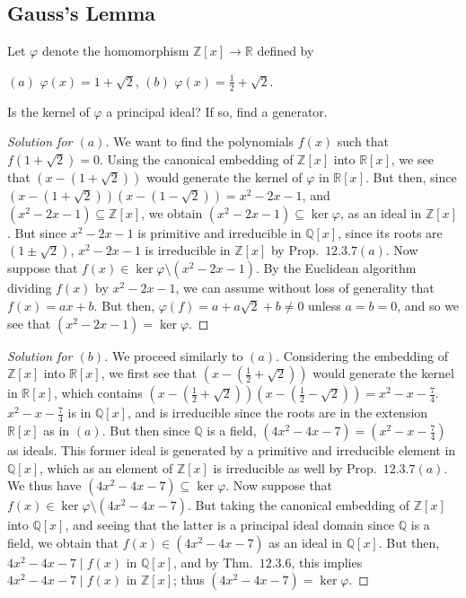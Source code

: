 \documentclass[12pt]{article}
\theoremstyle{remark}
\begin{document}
\subsection{Gauss's Lemma}
\begin{problem}
  Let $\varphi$ denote the homomorphism $\mathbb{Z}[x] \to \mathbb{R}$ defined by
  \par\noindent$(a)$ $\varphi(x) = 1 + \sqrt{2}$, $(b)$ $\varphi(x) = \frac{1}{2} + \sqrt{2}$.
  \par\noindent Is the kernel of $\varphi$ a principal ideal? If so, find a generator.
\end{problem}
\begin{proof}[Solution for $(a)$]
  We want to find the polynomials $f(x)$ such that $f(1+\sqrt{2}) = 0$. Using the canonical embedding of $\mathbb{Z}[x]$ into $\mathbb{R}[x]$, we see that $(x - (1+\sqrt{2}))$ would generate the kernel of $\varphi$ in $\mathbb{R}[x]$. But then, since $(x - (1+\sqrt{2}))(x - (1-\sqrt{2})) = x^2-2x-1$, and $(x^2-2x-1) \subseteq \mathbb{Z}[x]$, we obtain $(x^2-2x-1) \subseteq \ker\varphi$, as an ideal in $\mathbb{Z}[x]$. But since $x^2-2x-1$ is primitive and irreducible in $\mathbb{Q}[x]$, since its roots are $(1\pm\sqrt{2})$, $x^2-2x-1$ is irreducible in $\mathbb{Z}[x]$ by Prop.~$12.3.7(a)$. Now suppose that $f(x) \in \ker\varphi \setminus (x^2-2x-1)$. By the Euclidean algorithm dividing $f(x)$ by $x^2-2x-1$, we can assume without loss of generality that $f(x) = ax+b$. But then, $\varphi(f) = a + a\sqrt{2} + b \ne 0$ unless $a=b=0$, and so we see that $(x^2-2x-1) = \ker\varphi$.
\end{proof}
\begin{proof}[Solution for $(b)$]
  We proceed similarly to $(a)$. Considering the embedding of $\mathbb{Z}[x]$ into $\mathbb{R}[x]$, we first see that $(x - (\frac{1}{2}+\sqrt{2}))$ would generate the kernel in $\mathbb{R}[x]$, which contains $(x - (\frac{1}{2}+\sqrt{2}))(x - (\frac{1}{2}-\sqrt{2})) = x^2-x-\frac{7}{4}$. $x^2-x-\frac{7}{4}$ is in $\mathbb{Q}[x]$, and is irreducible since the roots are in the extension $\mathbb{R}[x]$ as in $(a)$. But then since $\mathbb{Q}$ is a field, $(4x^2-4x-7) = \left(  x^2-x-\frac{7}{4} \right)$ as ideals. This former ideal is generated by a primitive and irreducible element in $\mathbb{Q}[x]$, which as an element of $\mathbb{Z}[x]$ is irreducible as well by Prop.~$12.3.7(a)$. We thus have $(4x^2-4x-7) \subseteq \ker\varphi$. Now suppose that $f(x) \in \ker\varphi\setminus(4x^2-4x-7)$. But taking the canonical embedding of $\mathbb{Z}[x]$ into $\mathbb{Q}[x]$, and seeing that the latter is a principal ideal domain since $\mathbb{Q}$ is a field, we obtain that $f(x) \in (4x^2-4x-7)$ as an ideal in $\mathbb{Q}[x]$. But then, $4x^2-4x-7 \mid f(x)$ in $\mathbb{Q}[x]$, and by Thm.~$12.3.6$, this implies $4x^2-4x-7 \mid f(x)$ in $\mathbb{Z}[x]$; thus $(4x^2-4x-7) = \ker\varphi$.
\end{proof}
\end{document}
